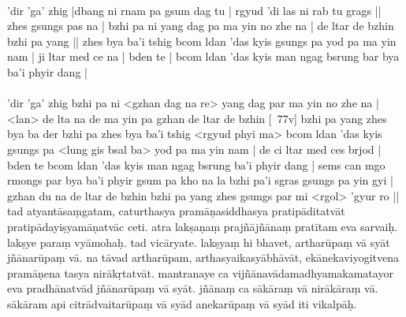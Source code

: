 \documentclass[12pt]{article}
\begin{document}
\textbf{\TVA}\\
'dir 'ga' zhig  |dbang ni rnam pa gsum dag tu | rgyud 'di las ni rab tu grags || zhes gsungs pas na | bzhi pa ni yang dag pa ma yin no zhe na | de ltar de bzhin bzhi pa yang || zhes bya ba'i tshig bcom ldan 'das kyis gsungs pa yod pa ma yin nam | ji ltar med ce na | bden te | bcom ldan 'das kyis man ngag bsrung bar bya ba'i phyir dang |\\

\textbf{\TVB}\\
'dir 'ga' zhig bzhi pa ni <gzhan dag na re> yang dag par ma yin no zhe na | <lan> de lta na de ma yin pa gzhan de ltar de bzhin [\TVB\ 77v] bzhi pa yang zhes bya ba der bzhi pa zhes bya ba'i tshig <rgyud phyi ma> bcom ldan 'das kyis gsungs pa <lung gis bsal ba> yod pa ma yin nam | de ci ltar med ces brjod | bden te bcom ldan 'das kyis man ngag bsrung ba'i phyir dang | sems can mgo rmongs par bya ba'i phyir gsum pa kho na la bzhi pa'i sgras gsungs pa yin gyi | gzhan du na de ltar de bzhin bzhi pa yang zhes gsungs par mi <rgol> 'gyur ro || \\

tad atyantāsaṃgatam, caturthasya pramāṇasiddhasya pratipāditatvāt pratipādayiṣyamāṇatvāc ceti. atra lakṣaṇaṃ prajñājñānaṃ pratītam eva sarvaiḥ. lakṣye\footnoteB{
	lakṣye] \ED\ (\emd); lakṣyā \MS
} paraṃ vyāmohaḥ. tad vicāryate. lakṣyaṃ hi bhavet,\footnoteB{
	lakṣyaṃ hi bhavet] \conj (\TIB : mtshon par bya ba yang srid na); lakṣyaṃ hi bhagavat \MS\ \EDD\ (°gavad)
} artharūpaṃ vā syāt jñānarūpaṃ vā. na tāvad artharūpam, arthasyaikasyābhāvāt, ekānekaviyogitvena pramāṇena tasya nirākṛtatvāt. mantranaye ca vijñānavādamadhyamakamatayor\footnoteB{
	matayor] \EDD ; tamayor \MS
} eva pradhānatvād jñānarūpaṃ vā syāt. jñānaṃ ca sākāraṃ vā nirākāraṃ vā. sākāram api citrādvaitarūpaṃ vā syād anekarūpaṃ vā syād iti vikalpāḥ.\\
\end{document}
